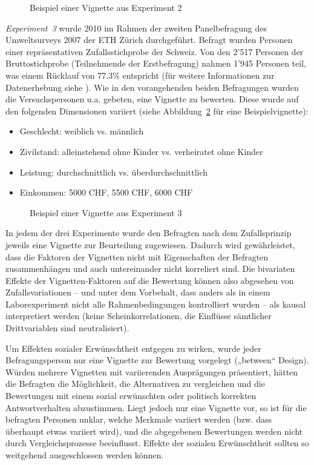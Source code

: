 \documentclass[a4paper,12pt]{article}
\renewcommand{\baselinestretch}{1.1}
\newif\ifcomments
\newcommand{\comment}[1]{%
    \ifcomments\marginpar{\renewcommand{\baselinestretch}{1}\tiny\hspace*{-1.1em}\colorbox{gray!20}%
    {\textcolor{red}{\parbox[t]{.9in}{\raggedright #1}}}}\fi}
\begin{document}
\begin{figure}\centering
    \caption{Beispiel einer Vignette aus Experiment 2}\label{fig-2}
\end{figure}

\emph{Experiment~3} wurde 2010 im Rahmen der zweiten Panelbefragung des Umweltsurveys
2007 der ETH Zürich durchgeführt. Befragt wurden Personen einer repräsentativen
Zufallsstichprobe der Schweiz. Von den 2'517 Personen der Bruttostichprobe
(Teilnehmende der Erstbefragung) nahmen 1'945 Personen teil, was einem Rücklauf
von 77.3\% entspricht (für weitere Informationen zur Datenerhebung siehe
\citealp{Diekmann-etal-2012}). Wie in den vorangehenden beiden Befragungen
wurden die Versuchspersonen u.a. gebeten, eine Vignette zu bewerten. Diese wurde
auf den folgenden Dimensionen variiert (siehe Abbildung~\ref{fig-3} für eine Beispielvignette):
\comment{Tabelle zu Faktoren wie bei Experiment 1}
\begin{itemize}
\item Geschlecht: weiblich vs. männlich
\item Zivilstand: alleinstehend ohne Kinder vs. verheiratet ohne Kinder
\item Leistung: durchschnittlich vs. überdurchschnittlich
\item Einkommen: 5000 CHF, 5500 CHF, 6000 CHF
\end{itemize}

\begin{figure}\centering
    \caption{Beispiel einer Vignette aus Experiment 3}\label{fig-3}
\end{figure}

In jedem der drei Experimente wurde den Befragten nach dem Zufallsprinzip jeweils eine Vignette
zur Beurteilung zugewiesen. Dadurch wird gewährleistet, dass die
Faktoren der Vignetten nicht mit Eigenschaften der Befragten zusammenhängen und
auch untereinander nicht korreliert sind. Die bivariaten Effekte der
Vignetten-Faktoren auf die Bewertung können also abgesehen von
Zufallsvariationen – und unter dem Vorbehalt, dass anders als in einem
Laborexperiment nicht alle Rahmenbedingungen kontrolliert wurden – als
kausal interpretiert werden (keine Scheinkorrelationen, die Einflüsse
sämtlicher Drittvariablen sind neutralisiert). \comment{Scheinkorrelation ist eigentlich ein blödes Wort, Scheinkausalität wäre treffender...}
Um Effekten sozialer Erwünschtheit entgegen zu wirken, wurde jeder
Befragungsperson nur eine Vignette zur Bewertung vorgelegt („between“ Design).
Würden mehrere Vignetten mit variierenden Ausprägungen präsentiert, hätten die
Befragten die Möglichkeit, die Alternativen zu vergleichen und die Bewertungen
mit einem sozial erwünschten oder politisch korrekten Antwortverhalten
abzustimmen. Liegt jedoch nur eine Vignette vor, so ist für die befragten
Personen unklar, welche Merkmale variiert werden (bzw. dass überhaupt etwas
variiert wird), und die abgegebenen Bewertungen werden nicht durch
Vergleichsprozesse beeinflusst. Effekte der sozialen Erwünschtheit sollten so
weitgehend ausgeschlossen werden können. \\
\end{document}
